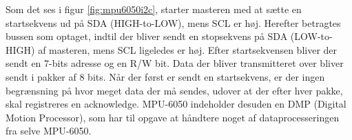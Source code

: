 Som det ses i figur \ref{fig:mpu6050i2c}, starter masteren med at sætte en startsekvens ud på SDA (HIGH-to-LOW), mens SCL er høj. Herefter betragtes bussen som optaget, indtil der bliver sendt en stopsekvens på SDA (LOW-to-HIGH) af masteren, mens SCL ligeledes er høj. Efter startsekvensen bliver der sendt en 7-bits adresse og en R/W bit. Data der bliver transmitteret over \IIC bliver sendt i pakker af 8 bits. Når der først er sendt en startsekvens, er der ingen begrænsning på hvor meget data der må sendes, udover at der efter hver pakke, skal registreres en acknowledge. MPU-6050 indeholder desuden en DMP (Digital Motion Processor), som har til opgave at håndtere noget af dataprocesseringen fra selve MPU-6050. 